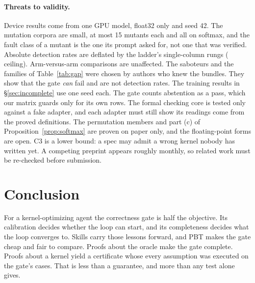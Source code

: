 \paragraph{Threats to validity.}
Device results come from one GPU model, float32 only and seed 42. The mutation corpora
are small, at most 15 mutants each and all on softmax, and the fault class of a mutant is
the one its prompt asked for, not one that was verified. Absolute detection rates are
deflated by the ladder's single-column rungs (\ladderCeiling{} ceiling). Arm-versus-arm
comparisons are unaffected. The saboteurs and the families of Table~\ref{tab:gap} were
chosen by authors who knew the bundles. They show that the gate \emph{can} fail and are
not detection rates. The training results in
\S\ref{sec:incomplete} use one seed each. The gate counts abstention as a pass, which our
matrix guards only for its own rows. The formal checking core is tested only against a
fake adapter, and each adapter must still show its readings come from the proved
definitions. The permutation members and part (c) of Proposition~\ref{prop:softmax} are
proven on paper only, and the floating-point forms are open. C3 is a lower bound: a spec
may admit a wrong kernel nobody has written yet. A competing preprint appears roughly
monthly, so related work must be re-checked before submission.

\section{Conclusion}

For a kernel-optimizing agent the correctness gate is half the objective. Its
calibration decides whether the loop can start, and its completeness decides what the loop
converges to. Skills carry those lessons forward, and PBT makes the gate cheap and fair to
compare. Proofs about the oracle make the gate complete. Proofs about a kernel yield a
certificate whose every assumption was executed on the gate's cases. That is less than a
guarantee, and more than any test alone gives.
